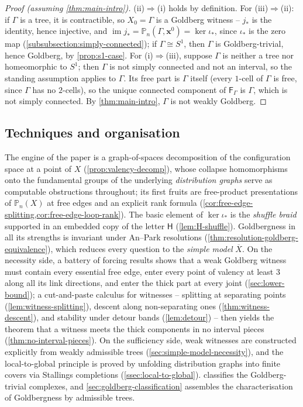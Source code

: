 \documentclass[reqno]{amsart}
\theoremstyle{definition}
\newcommand\bfx{\mathbf{x}}
\newcommand\sfH{\mathsf{H}}
\newcommand{\PB}{\mathbb{P}}
\newcommand{\im}{\operatorname{im}}
\newcommand{\base}{\bfx^0}
\renewcommand{\bar}{\overline}
\numberwithin{equation}{section}
\begin{document}
\begin{proof}[Proof (assuming \cref{thm:main-intro})]
(ii)\(\Rightarrow\)(i) holds by definition. For
(iii)\(\Rightarrow\)(ii): if \(\Gamma\) is a tree, it is
contractible, so \(X_0=\Gamma\) is a Goldberg witness --
\(j_\ast\) is the identity, hence injective, and
\(\im j_\ast=\PB_n(\Gamma,\base)=\ker\iota_\ast\), since
\(\iota_\ast\) is the zero map
(\cref{subsubsection:simply-connected}); if
\(\Gamma\cong S^1\), then \(\Gamma\) is Goldberg-trivial, hence
Goldberg, by \cref{prop:s1-case}. For
(i)\(\Rightarrow\)(iii), suppose \(\Gamma\) is neither a tree
nor homeomorphic to \(S^1\); then \(\Gamma\) is not simply
connected and not an interval, so the standing assumption
applies to \(\Gamma\). Its free part is \(\Gamma\) itself
(every \(1\)-cell of \(\Gamma\) is free, since \(\Gamma\) has
no \(2\)-cells), so the unique connected component of
\(\mathsf{F}_\Gamma\) is \(\Gamma\), which is not simply
connected. By \cref{thm:main-intro}, \(\Gamma\) is not weakly
Goldberg.
\end{proof}

\subsection{Techniques and organisation}
\label{ssec:techniques}
The engine of the paper is a graph-of-spaces decomposition of
the configuration space at a point of \(X\)
(\cref{prop:valency-decomp}), whose collapse homomorphisms onto
the fundamental groups of the underlying \emph{distribution
graphs} serve as computable obstructions throughout; its first
fruits are free-product presentations of \(\PB_n(X)\) at free
edges and an explicit rank formula
(\cref{cor:free-edge-splitting,cor:free-edge-loop-rank}). The
basic element of \(\ker\iota_\ast\) is the \emph{shuffle braid}
supported in an embedded copy of the letter \(\sfH\)
(\cref{lem:H-shuffle}). Goldbergness in all its strengths is
invariant under An--Park resolutions
(\cref{thm:resolution-goldberg-equivalence}), which reduces
every question to the \emph{simple model} \(\bar X\). On the
necessity side, a battery of forcing results shows that a weak
Goldberg witness must contain every essential free edge, enter
every point of valency at least \(3\) along all its link
directions, and enter the thick part at every joint
(\cref{sec:lower-bound}); a cut-and-paste calculus for
witnesses -- splitting at separating points
(\cref{lem:witness-splitting}), descent along non-separating
ones (\cref{thm:witness-descent}), and stability under detour
bands (\cref{lem:detour}) -- then yields the theorem that a
witness meets the thick components in no interval pieces
(\cref{thm:no-interval-pieces}). On the sufficiency side,
weak witnesses are constructed explicitly from weakly admissible trees
(\cref{sec:simple-model-necessity}), and the local-to-global
principle is proved by unfolding distribution graphs into
finite covers via Stallings completions
(\cref{ssec:local-to-global}). 
classifies the Goldberg-trivial complexes, and
\cref{sec:goldberg-classification} assembles the
characterisation of Goldbergness by admissible trees.
\end{document}
